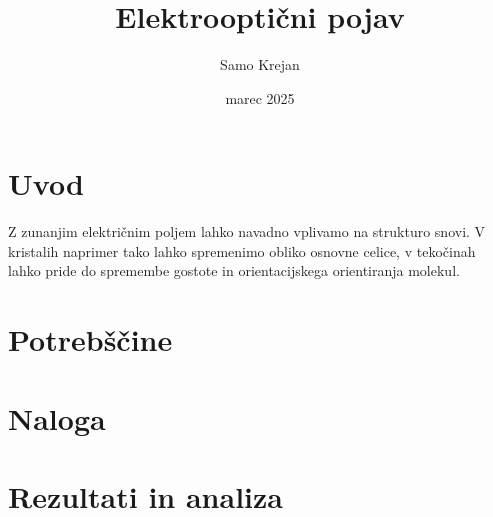 \documentclass[12pt]{article}
\title{\textbf{Elektrooptični pojav}}
\author{Samo Krejan}
\date{marec 2025}
\begin{document}
\maketitle

\section{Uvod}

Z zunanjim električnim poljem lahko navadno vplivamo na strukturo snovi. V kristalih naprimer tako lahko spremenimo obliko osnovne celice, v tekočinah lahko pride do spremembe gostote in orientacijskega orientiranja molekul.

\section{Potrebščine}


\section{Naloga}


\section{Rezultati in analiza}
\end{document}
